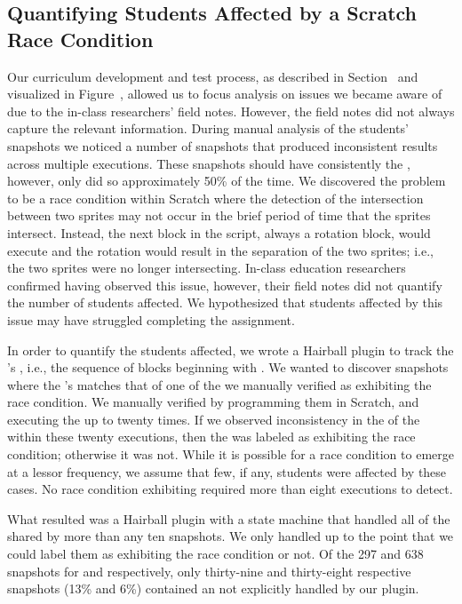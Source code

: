 \subsection{Quantifying Students Affected by a Scratch Race Condition}

Our curriculum development and test process, as described in
Section~ and visualized in Figure~,
allowed us to focus analysis on issues we became aware of due to the in-class
researchers' field notes. However, the field notes did not always capture the
relevant information. During manual analysis of the students' snapshots we
noticed a number of snapshots that produced inconsistent results across
multiple executions. These snapshots should have consistently \caught{} the
\zebra{}, however, only did so approximately 50\% of the time. We discovered
the problem to be a race condition within Scratch where the detection of the
intersection between two sprites may not occur in the brief period of time that
the sprites intersect. Instead, the next block in the script, always a rotation
block, would execute and the rotation would result in the separation of the two
sprites; i.e., the two sprites were no longer intersecting. In-class education
researchers confirmed having observed this issue, however, their field notes
did not quantify the number of students affected. We hypothesized that students
affected by this issue may have struggled completing the assignment.

In order to quantify the students affected, we wrote a Hairball plugin to track
the \net{}'s \exe{}, i.e., the sequence of blocks beginning with
\netclicked{}. We wanted to discover snapshots where the \net{}'s \exe{}
matches that of one of the  we manually verified as exhibiting the race
condition. We manually verified  by programming them in Scratch, and
executing the \sprogram{} up to twenty times. If we observed inconsistency in
the  of the \zebra{} within these twenty executions, then the \exe{}
was labeled as exhibiting the race condition; otherwise it was not. While it is
possible for a race condition to emerge at a lessor frequency, we assume that
few, if any, students were affected by these cases. No race condition
exhibiting \exe{} required more than eight executions to detect.

What resulted was a Hairball plugin with a state machine that handled all
 of the \net{} shared by more than any ten snapshots. We only handled
 up to the point that we could label them as exhibiting the race
condition or not. Of the 297 and 638 snapshots for \sone{} and \stwo{}
respectively, only thirty-nine and thirty-eight respective snapshots (13\% and
6\%) contained an \exe{} not explicitly handled by our plugin.

